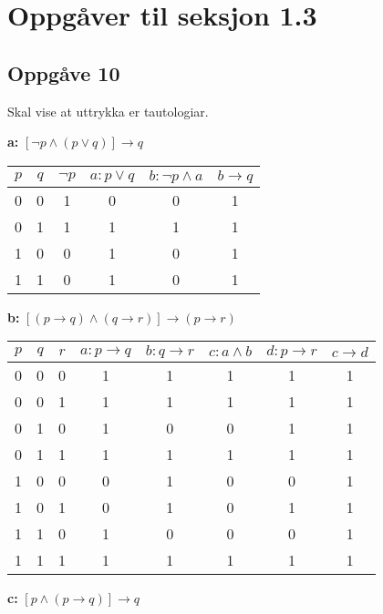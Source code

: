 \documentclass[a4paper, 11pt]{article}
\newcommand{\deloppg}[1]{\vspace{1mm}\noindent \textbf{\themecolor{#1:}}}
\newcommand{\themeshade}{Mahogany}
\newcommand{\themecolor}[1]{\textcolor{\themeshade}{#1}}
\begin{document}
\newpage \section*{Oppgåver til seksjon 1.3}

\subsection*{Oppgåve 10}
Skal vise at uttrykka er tautologiar.

\deloppg{a} $[\neg p \land (p \lor q)] \rightarrow q$

\begin{tabular}{c c c c c | c}
    $p$ &  $q$  &  $\neg p$ & $a: p \lor q$ & $b: \neg p \land a$   & $b \rightarrow q$ \\
    \hline
    0   & 0     & 1         & 0             & 0                     & 1                 \\
    0   & 1     & 1         & 1             & 1                     & 1                 \\
    1   & 0     & 0         & 1             & 0                     & 1                 \\
    1   & 1     & 0         & 1             & 0                     & 1                 \\
\end{tabular}

\deloppg{b} $[(p \rightarrow q) \land (q \rightarrow r)] \rightarrow (p \rightarrow r)$

\begin{tabular}{ccccccc|c}
    $p$ & $q$ & $r$ & $a: p \rightarrow q$ & $b: q \rightarrow r$
    & $c: a \land b$ & $d: p \rightarrow r$ & $c \rightarrow d$\\
    \hline
    0 & 0 & 0 & 1 & 1 & 1 & 1 & 1 \\
    0 & 0 & 1 & 1 & 1 & 1 & 1 & 1 \\
    0 & 1 & 0 & 1 & 0 & 0 & 1 & 1 \\
    0 & 1 & 1 & 1 & 1 & 1 & 1 & 1 \\
    1 & 0 & 0 & 0 & 1 & 0 & 0 & 1 \\
    1 & 0 & 1 & 0 & 1 & 0 & 1 & 1 \\
    1 & 1 & 0 & 1 & 0 & 0 & 0 & 1 \\
    1 & 1 & 1 & 1 & 1 & 1 & 1 & 1 \\
\end{tabular}

\deloppg{c} $[p \land (p \rightarrow q)] \rightarrow q$
\end{document}
